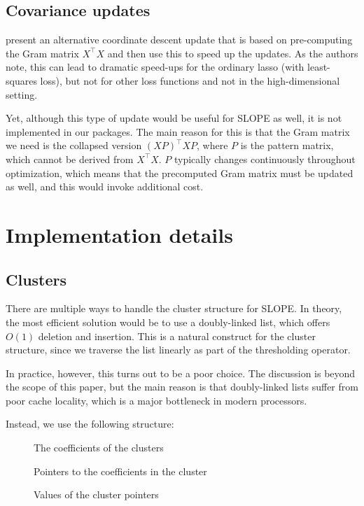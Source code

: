 \documentclass[article]{jss}
\begin{document}
\subsection{Covariance updates}

\citet{friedman2010} present an alternative coordinate descent update that is
based on pre-computing the Gram matrix \(X^\intercal X\) and then use this to
speed up the updates. As the authors note, this can lead to dramatic speed-ups
for the ordinary lasso (with least-squares loss), but not for other loss
functions and not in the high-dimensional setting.

Yet, although this type of update would be useful for SLOPE as well, it is not
implemented in our packages. The main reason for this is that the Gram matrix
we need is the collapsed version \((XP)^\intercal XP\), where \(P\) is the
pattern matrix, which cannot be derived from \(X^\intercal X\). \(P\) typically
changes continuously throughout optimization, which means that the precomputed
Gram matrix must be updated as well, and this would invoke additional cost.

\section{Implementation details}
\label{sec:implementation-details}

\subsection{Clusters}
\label{sec:clusters}

There are multiple ways to handle the cluster structure for SLOPE.
In theory, the most efficient solution would be to use a
doubly-linked list, which offers \(O(1)\) deletion and insertion.
This is a natural construct for the cluster structure, since we
traverse the list linearly as part of the thresholding operator.

In practice, however, this turns out to be a poor choice.
The discussion is beyond the scope of this paper, but the main
reason is that doubly-linked lists suffer from poor cache
locality, which is a major bottleneck in modern processors.

Instead, we use the following structure:

\begin{description}
  \item[] The coefficients of the clusters
  \item[] Pointers to the coefficients in the cluster
  \item[] Values of the cluster pointers
\end{description}
\end{document}
